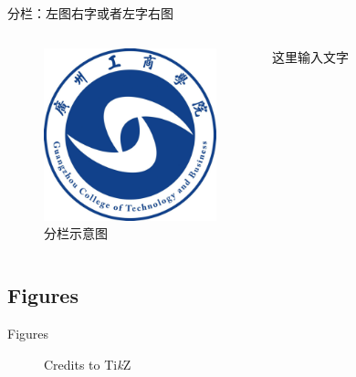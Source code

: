 \documentclass[
10pt,
aspectratio=43,
]{beamer}
\begin{document}
\begin{frame}{分栏：左图右字或者左字右图}
\begin{columns}
		\begin{figure}
		\centering
		\includegraphics[width=5cm]{logo}
		\caption{分栏示意图}
	\end{figure}
	\small
	这里输入文字
\end{columns}
\end{frame}


\subsection{Figures}
\begin{frame}[c]{Figures}
	\begin{figure}
		\centering
		\caption{Credits to Ti\textit{k}Z}
	\end{figure}
\end{frame}	
\end{document}
